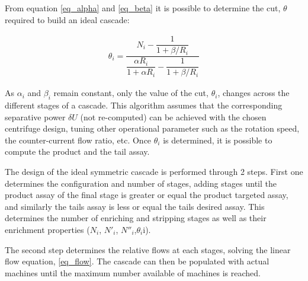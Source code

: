 From equation \eqref{eq_alpha} and \eqref{eq_beta} it is possible to determine
the cut, $\theta$ required to build an ideal cascade:

\begin{eqnarray}
    \theta_{i} = \dfrac{N_{i} - \dfrac{1}{1 + \beta/R_{i}}}{ \dfrac{\alpha R_{i}}{1 + \alpha R_{i}} -
           \dfrac{1}{1 + \beta/R_{i}}}
           \label{eq_theta}
\end{eqnarray}


As $\alpha_{i}$ and $\beta_{i}$ remain constant, only the value of the cut,
$\theta_{i}$, changes across the different stages of a cascade.  This algorithm
assumes that the corresponding separative power $\delta U$ (not re-computed) can
be achieved with the chosen centrifuge design, tuning other operational
parameter such as the rotation speed, the counter-current flow ratio, etc.  Once
$\theta_{i}$ is determined, it is possible to compute the product and the tail
assay.




The design of the ideal symmetric cascade is performed through 2 steps.  First
one determines the configuration and number of stages, adding stages until the
product assay of the final stage is greater or equal the product targeted assay,
and similarly the tails assay is less or equal the tails desired assay.  This
determines the number of enriching and stripping stages as well as their
enrichment properties ($N_{i}$, $N'_{i}$, $N''_{i}$,$\theta_{i}$i).


The second step determines the relative flows at each stages, solving the linear
flow equation, \eqref{eq_flow}.
The cascade can then be populated with actual machines until the maximum number
available of machines is reached.

